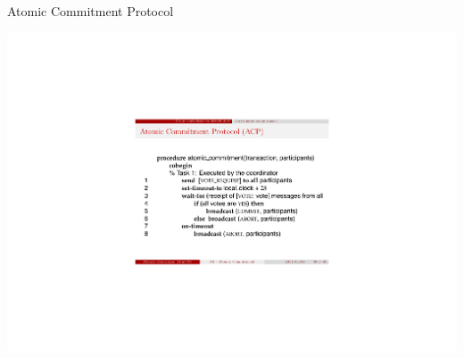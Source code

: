 \begin{frame}{Atomic Commitment Protocol}

\includegraphics[width=\textwidth]{alg1.pdf}

\end{frame}



%
%
%
%

